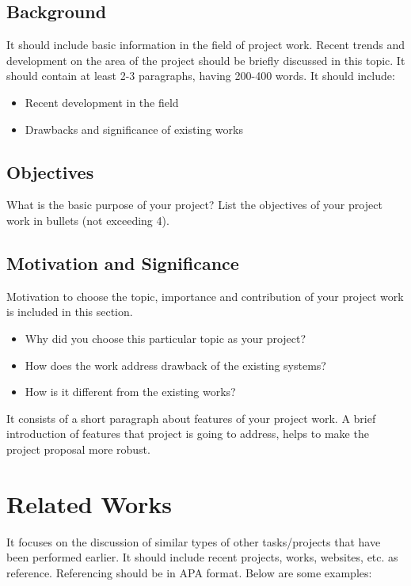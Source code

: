 \documentclass{projectreport}
\begin{document}
	\section{Background}
	It should include basic information in the field of project work. Recent trends and development on the area of the project should be briefly discussed in this topic. It should contain at least 2-3 paragraphs, having 200-400 words.
	It should include:
	
	\begin{itemize}
		\item Recent development in the field
		\item Drawbacks and significance of existing works
	\end{itemize}
	
	\section{Objectives}
	What is the basic purpose of your project? List the objectives of your project work in bullets (not exceeding 4).
	
	\section{Motivation and Significance}
	Motivation to choose the topic, importance and contribution of your project work is included in this section.
	
	\begin{itemize}
		\item Why did you choose this particular topic as your project?
		\item How does the work address drawback of the existing systems?
		\item How is it different from the existing works?
	\end{itemize}

	It consists of a short paragraph about features of your project work. A brief introduction of features that project is going to address, helps to make the project proposal more robust.
	
	\chapter{Related Works}
	
	It focuses on the discussion of similar types of other tasks/projects that have been performed earlier. It should include recent projects, works, websites, etc. as reference. Referencing should be in APA format. Below are some examples:
	
\end{document}
